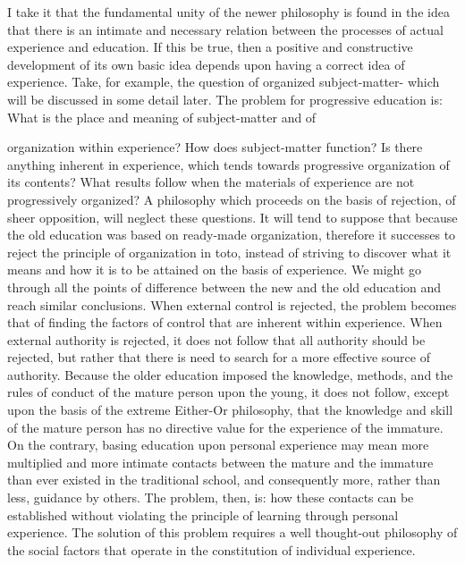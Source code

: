 I take it that the fundamental unity of the newer philosophy is found in the idea that 
there is an intimate and necessary relation between the processes of actual experience and 
education. If this be true, then a positive and constructive development of its own basic 
idea depends upon having a correct idea of experience. Take, for example, the question of 
organized subject-matter- which will be discussed in some detail later. The problem for 
progressive education is: What is the place and meaning of subject-matter and of 



organization within experience? How does subject-matter function? Is there anything 
inherent in experience, which tends towards progressive organization of its contents? 
What results follow when the materials of experience are not progressively organized? A 
philosophy which proceeds on the basis of rejection, of sheer opposition, will neglect 
these questions. It will tend to suppose that because the old education was based on 
ready-made organization, therefore it successes to reject the principle of organization in 
toto, instead of striving to discover what it means and how it is to be attained on the basis 
of experience. We might go through all the points of difference between the new and the 
old education and reach similar conclusions. When external control is rejected, the 
problem becomes that of finding the factors of control that are inherent within 
experience. When external authority is rejected, it does not follow that all authority 
should be rejected, but rather that there is need to search for a more effective source of 
authority. Because the older education imposed the knowledge, methods, and the rules of 
conduct of the mature person upon the young, it does not follow, except upon the basis of 
the extreme Either-Or philosophy, that the knowledge and skill of the mature person has 
no directive value for the experience of the immature. On the contrary, basing education 
upon personal experience may mean more multiplied and more intimate contacts between 
the mature and the immature than ever existed in the traditional school, and consequently 
more, rather than less, guidance by others. The problem, then, is: how these contacts can 
be established without violating the principle of learning through personal experience. 
The solution of this problem requires a well thought-out philosophy of the social factors 
that operate in the constitution of individual experience. 

